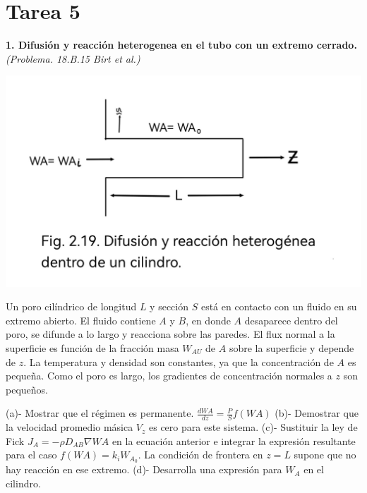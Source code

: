 \section*{Tarea 5}
\textbf{1. Difusión y reacción heterogenea en el tubo con un extremo cerrado.} \textit{(Problema. 18.B.15 Birt et al.)}
\flushleft
\begin{minipage}{0.4\textwidth} %
    \includegraphics[width=\linewidth]{./Capitulo2/Imagenes/imagen-7.jpg} %
\end{minipage}
\hfill %
\begin{minipage}{0.5\textwidth} %
Un poro cilíndrico de longitud \( L \) y sección \( S \) está en contacto con un fluido en su extremo abierto. El fluido contiene \( A \) y \( B \),  en donde \( A \) desaparece dentro del poro, se difunde a lo largo y reacciona sobre las paredes. El flux normal a la superficie es función de la fracción masa \( W_{AU} \) de \( A \) sobre la superficie y depende de \( z \). La temperatura y densidad son constantes, ya que la concentración de \( A \) es pequeña. Como el poro es largo, los gradientes de concentración normales a \( z \) son pequeños.
\end{minipage}
\flushleft
(a)-  Mostrar que el régimen es permanente.\quad
$
\frac{dWA}{dz} = \frac{P}{S} f(WA)
$
\flushleft
(b)- Demostrar que la velocidad promedio másica \( V_{z} \) es cero para este sistema.
\flushleft
(c)- Sustituir la ley de Fick \( J_A = -\rho D_{AB} \nabla WA \) en la ecuación anterior e integrar la expresión resultante para el caso \( f(WA) = k_iW_{A_0} \).  La condición de frontera en \( z = L \) supone que no hay reacción en ese extremo.
\flushleft
(d)- Desarrolla una expresión para \( W_A \) en el cilindro.
